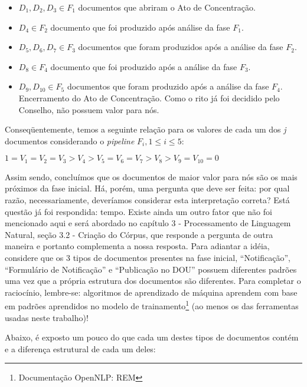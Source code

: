 \documentclass[11pt]{report}
\newcommand{\quotes}[1]{``#1''}
\begin{document}
\begin{itemize}
  \item $D_1, D_2, D_3 \in F_1$ documentos que abriram o Ato de Concentração.
  \item $D_4 \in F_2$ documento que foi produzido após análise da fase $F_1$.
  \item $D_5, D_6, D_7 \in F_3$ documentos que foram produzidos após a análise da fase $F_2$.
  \item $D_8 \in F_4$ documento que foi produzido após a análise da fase $F_3$.
  \item $D_9, D_{10} \in F_5$ documentos que foram produzido após a análise da fase $F_4$. Encerramento do Ato de Concentração. Como o rito já foi decidido pelo Conselho,
  não possuem valor para nós.
\end{itemize}

Conseqüentemente, temos a seguinte relação para os valores de cada um dos \textit{j} documentos considerando o \textit{pipeline} $F_i, 1 \leq i \leq 5$:
\begin{center}
  $1 = V_1 = V_2 = V_3 > V_4 > V_5 = V_6 = V_7 > V_8 > V_9 = V_{10} = 0$
\end{center}

Assim sendo, concluímos que os documentos de maior valor para nós são os mais próximos da fase inicial. Há, porém, uma pergunta que deve ser feita: por qual razão,
necessariamente, deveríamos considerar esta interpretação correta? Está questão já foi respondida: tempo. Existe ainda um outro fator que não foi mencionado aqui e será abordado
no capítulo 3 - Processamento de Linguagem Natural, seção 3.2 - Criação do Córpus, que responde a pergunta de outra maneira e portanto complementa a nossa resposta. Para adiantar a idéia, considere que os 3 tipos de
documentos presentes na fase inicial, \quotes{Notificação}, \quotes{Formulário de Notificação} e \quotes{Publicação no DOU} possuem diferentes padrões uma vez que a própria
estrutura dos documentos são diferentes. Para completar o raciocínio, lembre-se: algoritmos de aprendizado de máquina aprendem com base em padrões aprendidos no modelo
de trainamento\footnote[6]{Documentação OpenNLP: REM} (ao menos os das ferramentas usadas neste trabalho)!

Abaixo, é exposto um pouco do que cada um destes tipos de documentos contém e a diferença estrutural de cada um deles:
\end{document}
